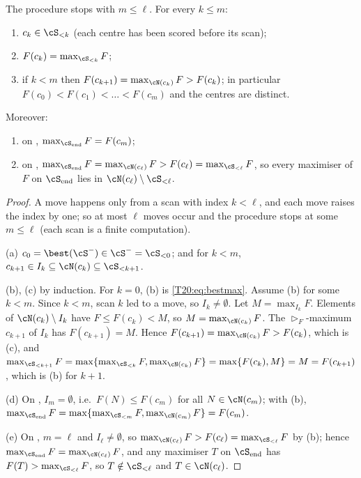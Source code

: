 \documentclass[11pt]{report}
\begin{document}
\begin{T20lemma}\label{T20:lem:inv}
The procedure stops with $m\le\ell$. For every $k\le m$:
\begin{enumerate}[label=(\alph*)]
\item $c_k\in\cS_{<k}$ (each centre has been scored before its scan);
\item $F(c_k)=\max_{\cS_{<k}}F$;
\item if $k<m$ then $F(c_{k+1})=\max_{\cN(c_k)}F>F(c_k)$; in particular $F(c_0)<F(c_1)<\dots<F(c_m)$ and the centres are distinct.
\end{enumerate}
Moreover:
\begin{enumerate}[label=(\alph*),resume]
\item on \NOIMP, $\max_{\cS_{\rm end}}F=F(c_m)$;
\item on \LIMIT, $\max_{\cS_{\rm end}}F=\max_{\cN(c_\ell)}F>F(c_\ell)=\max_{\cS_{<\ell}}F$, so every maximiser of $F$ on $\cS_{\rm end}$ lies in $\cN(c_\ell)\setminus\cS_{<\ell}$.
\end{enumerate}
\end{T20lemma}
\begin{proof}
A move happens only from a scan with index $k<\ell$, and each move raises the index by one; so at most $\ell$ moves occur and the procedure stops at some $m\le\ell$ (each scan is a finite computation).

(a) $c_0=\best(\cS^-)\in\cS^-=\cS_{<0}$; and for $k<m$, $c_{k+1}\in I_k\subseteq\cN(c_k)\subseteq\cS_{<k+1}$.

(b), (c) by induction. For $k=0$, (b) is \eqref{T20:eq:bestmax}. Assume (b) for some $k<m$. Since $k<m$, scan $k$ led to a move, so $I_k\ne\emptyset$. Let $M=\max_{I_k}F$. Elements of $\cN(c_k)\setminus I_k$ have $F\le F(c_k)<M$, so $M=\max_{\cN(c_k)}F$. The $\rhd_F$-maximum $c_{k+1}$ of $I_k$ has $F(c_{k+1})=M$. Hence $F(c_{k+1})=\max_{\cN(c_k)}F>F(c_k)$, which is (c), and
$\max_{\cS_{<k+1}}F=\max\{\max_{\cS_{<k}}F,\max_{\cN(c_k)}F\}=\max\{F(c_k),M\}=M=F(c_{k+1})$, which is (b) for $k+1$.

(d) On \NOIMP, $I_m=\emptyset$, i.e.\ $F(N)\le F(c_m)$ for all $N\in\cN(c_m)$; with (b), $\max_{\cS_{\rm end}}F=\max\{\max_{\cS_{<m}}F,\max_{\cN(c_m)}F\}=F(c_m)$.

(e) On \LIMIT, $m=\ell$ and $I_\ell\ne\emptyset$, so $\max_{\cN(c_\ell)}F>F(c_\ell)=\max_{\cS_{<\ell}}F$ by (b); hence $\max_{\cS_{\rm end}}F=\max_{\cN(c_\ell)}F$, and any maximiser $T$ on $\cS_{\rm end}$ has $F(T)>\max_{\cS_{<\ell}}F$, so $T\notin\cS_{<\ell}$ and $T\in\cN(c_\ell)$.
\end{proof}
\end{document}
